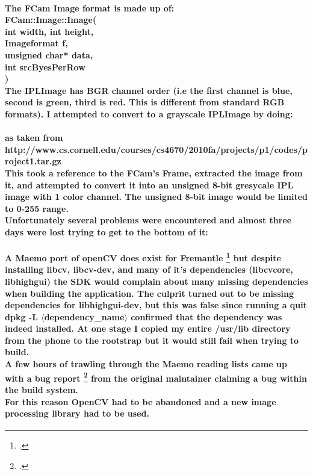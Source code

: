 \paragraph{The FCam Image format is made up of:\\
\tab FCam::Image::Image(\\
\tab\tab int width,  int height,\\
\tab\tab Imageformat f,\\
\tab\tab unsigned char* data,\\
\tab\tab int srcByesPerRow\\
)\\
The IPLImage has BGR channel order (i.e the first channel is blue, second is green, third is red. This is different from standard RGB formats). I attempted to convert to a grayscale IPLImage by doing:}
\begin{frame}[fragile]

\end{frame}
\paragraph{as taken from http://www.cs.cornell.edu/courses/cs4670/2010fa/projects/p1/codes/project1.tar.gz\\
This took a reference to the FCam's Frame, extracted the image from it, and attempted to convert it into an unsigned 8-bit gresycale IPL image with 1 color channel. The unsigned 8-bit image would be limited to 0-255 range.\\
Unfortunately several problems were encountered and almost three days were lost trying to get to the bottom of it:}
\paragraph{
A Maemo port of openCV does exist for Fremantle \footcite{libcv} but despite installing libcv, libcv-dev, and many of it's dependencies (libcvcore, libhighgui) the SDK would complain about many missing dependencies when building the application. The culprit turned out to be missing dependencies for libhighgui-dev, but this was false since running a quit dpkg -L \(\langle\)dependency\_name\(\rangle\) confirmed that the dependency was indeed installed. At one stage I copied my entire /usr/lib directory from the phone to the rootstrap but it would still fail when trying to build.\\
A few hours of trawling through the Maemo reading lists came up with a bug report \footcite{highgui-dev} from the original maintainer claiming a bug within the build system.\\
For this reason OpenCV had to be abandoned and a new image processing library had to be used.
}
